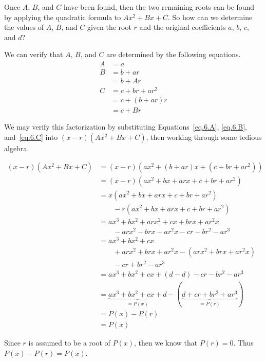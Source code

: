 Once $A$, $B$,
and $C$ have been found, then the two remaining roots can be found by
applying the quadratic formula to $A x^2 + B x + C$.  So how can we
determine the values of $A$, $B$, and $C$ given the root $r$ and the
original coefficients $a$, $b$, $c$, and $d$?


We can verify that $A$, $B$, and $C$ are determined by the following equations.
\begin{align}
 A &= a\label{eq.6.A}\\
  B &= b + a r\nonumber\\
   &= b + A r\label{eq.6.B}\\
  C &= c + b r + a r^2\nonumber\\
  &= c + (b + a r) r\nonumber\\
  &= c + B r\label{eq.6.C}
\end{align}



We may verify this factorization by substituting Equations~\eqref{eq.6.A}, \eqref{eq.6.B}, and~\eqref{eq.6.C}
into $(x-r) (A x^2 + B x + C)$, then working through some tedious algebra.

\begin{align*}
  (x-r) (A x^2 + B x + C)
  &= (x-r) (a x^2 + (b + a r) x + (c + b r + a r^2))\\
  &= (x-r) (a x^2 + b x + a r x + c + b r + a r^2)\\
  &= x(a x^2 + b x + a r x + c + b r + a r^2) \\
  &\quad\quad - r (a x^2 + b x + a r x + c + b r + a r^2)\\
  &= a x^3 + b x^2 + a r x^2 + c x + b r x + a r^2 x\\
  &\quad\quad - a r x^2 - b r x - a r^2 x - c r - b r^2 - a r^3\\
  &= a x^3 + b x^2 + c x  \\
  &\quad\quad + a r x^2 + b r x + a r^2 x - ( a r x^2 + b r x + a r^2 x) \\
  &\quad\quad  - c r + b r^2 - a r^3\\
  &= a x^3 + b x^2 + c x + ( d - d) - c r - b r^2 - a r^3\\
  &= \underbrace{a x^3 + b x^2 + c x +  d}_{=P(x)} - (\underbrace{d + c r + b r^2 + a r^3}_{=P(r)})\\
  &= P(x) - P(r)\\
  &= P(x) 
\end{align*}

Since $r$ is assumed to be a root of $P(x)$, then we know that $P(r)=0$.  Thus $P(x)-P(r)=P(x)$.

